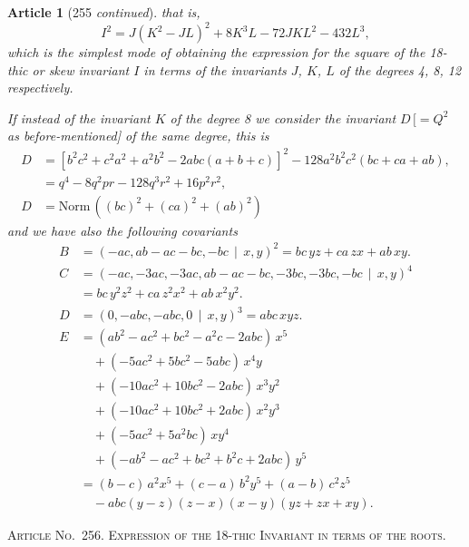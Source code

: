 \documentclass[11pt,a4paper]{article}
\theoremstyle{cayley}
\newtheorem{art}{Article}
\begin{document}
\begin{art}[255 \textit{continued}]
that is,
\[
I^2 = J(K^2-JL)^2 + 8K^3L - 72JKL^2 - 432L^3,
\]
which is the simplest mode of obtaining the expression for the square of the 18-thic or skew invariant $I$ in terms of the invariants $J$, $K$, $L$ of the degrees 4, 8, 12 respectively.

If instead of the invariant $K$ of the degree 8 we consider the invariant $D\,[=Q^2$ as before-mentioned] of the same degree, this is
\begin{align*}
D &= [b^2c^2 + c^2a^2 + a^2b^2 - 2abc(a+b+c)]^2 - 128a^2b^2c^2(bc+ca+ab), \\
&= q^4 - 8q^2pr - 128q^3r^2 + 16p^2r^2, \\
D &= \text{Norm}\,((bc)^2 + (ca)^2 + (ab)^2)
\end{align*}
and we have also the following covariants
\begin{align*}
B &= (-ac, ab-ac-bc, -bc \,\mid\, x, y)^2 = bc\,yz + ca\,zx + ab\,xy. \\
C &= (-ac, -3ac, -3ac, ab-ac-bc, -3bc, -3bc, -bc \,\mid\, x, y)^4 \\
  &= bc\,y^2z^2 + ca\,z^2x^2 + ab\,x^2y^2. \\
D &= (0, -abc, -abc, 0 \,\mid\, x, y)^3 = abc\,xyz. \\
E &= (ab^2 - ac^2 + bc^2 - a^2c - 2abc)\,x^5 \\
  &\quad + (-5ac^2 + 5bc^2 - 5abc)\,x^4y \\
  &\quad + (-10ac^2 + 10bc^2 - 2abc)\,x^3y^2 \\
  &\quad + (-10ac^2 + 10bc^2 + 2abc)\,x^2y^3 \\
  &\quad + (-5ac^2 + 5a^2bc)\,xy^4 \\
  &\quad + (-ab^2 - ac^2 + bc^2 + b^2c + 2abc)\,y^5 \\
  &= (b-c)\,a^2x^5 + (c-a)\,b^2y^5 + (a-b)\,c^2z^5 \\
  &\quad - abc(y-z)(z-x)(x-y)(yz+zx+xy).
\end{align*}
\end{art}

\begin{center}
\textsc{Article No.\ 256. Expression of the 18-thic Invariant in terms of the roots.}
\end{center}
\end{document}
